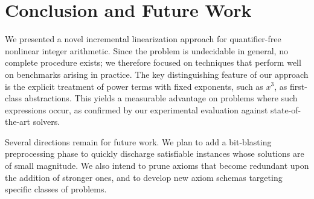 \section{Conclusion and Future Work}\label{sec:conclusion}
We presented a novel incremental linearization approach for quantifier-free
nonlinear integer arithmetic.
Since the problem is undecidable in general, no complete procedure exists;
we therefore focused on techniques that perform well on benchmarks arising
in practice.
The key distinguishing feature of our approach is the explicit treatment of
power terms with fixed exponents, such as $x^3$, as first-class abstractions.
This yields a measurable advantage on problems where such expressions occur,
as confirmed by our experimental evaluation against state-of-the-art solvers.

Several directions remain for future work.
We plan to add a bit-blasting~\cite{bitblast} preprocessing phase to quickly discharge
satisfiable instances whose solutions are of small magnitude.
We also intend to prune axioms that become redundant upon the addition of
stronger ones, and to develop new axiom schemas targeting specific classes
of problems.


